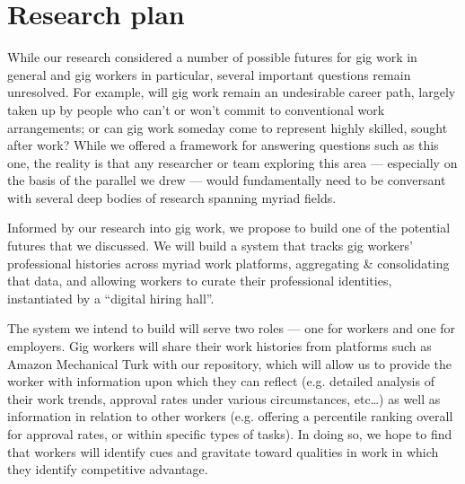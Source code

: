 \documentclass{article}
\newcommand{\topic}[1]{{\color{Blue}#1}}
\newenvironment{blah}{\par\color{Gray}\itshape}{\par}
\begin{document}
\section*{Research plan}
\topic{While our research considered a number of possible futures for gig work in general and gig workers in particular,
several important questions remain unresolved.}
For example, will gig work remain an undesirable career path,
largely taken up by people who can't or won't commit to conventional work arrangements;
or can gig work someday come to represent highly skilled, sought after work?
While we offered a framework for answering questions such as this one, the reality is that
any researcher or team exploring this area
--- especially on the basis of the parallel we drew ---
would fundamentally need to be conversant with several deep bodies of research spanning myriad fields.

Informed by our research into gig work, we propose to build one of the potential futures that we discussed.
\topic{We will build a system that tracks gig workers' professional histories across myriad work platforms,
aggregating \& consolidating that data, and
allowing workers to curate their professional identities, instantiated by a ``digital hiring hall''.}

\topic{The system we intend to build will serve two roles --- one for workers and one for employers.} %
Gig workers will share their work histories from platforms such as Amazon Mechanical Turk with our repository,
which will allow us to provide the worker with information upon which they can reflect
(e.g. detailed analysis of their work trends, approval rates under various circumstances, etc\dots)
as well as information in relation to other workers
(e.g. offering a percentile ranking overall for approval rates, or within specific types of tasks).
In doing so, we hope to find that workers will identify cues and gravitate toward qualities in work
in which they identify competitive advantage.
\end{document}
